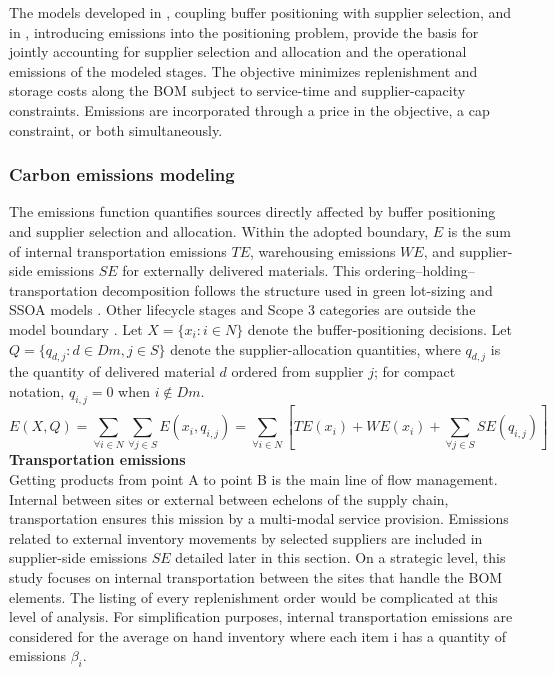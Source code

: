\documentclass[preprint,12pt,authoryear]{elsarticle}
\begin{document}
The models developed in \cite{ACHERGUI4}, coupling buffer positioning with supplier selection, and in \cite{achergui3}, introducing emissions into the positioning problem, provide the basis for jointly accounting for supplier selection and allocation and the operational emissions of the modeled stages. The objective minimizes replenishment and storage costs along the BOM subject to service-time and supplier-capacity constraints. Emissions are incorporated through a price in the objective, a cap constraint, or both simultaneously.
\subsubsection{Carbon emissions modeling}\label{ss:co2}
The emissions function quantifies sources directly affected by buffer positioning and supplier selection and allocation. Within the adopted boundary, $E$ is the sum of internal transportation emissions $TE$, warehousing emissions $WE$, and supplier-side emissions $SE$ for externally delivered materials. This ordering--holding--transportation decomposition follows the structure used in green lot-sizing and SSOA models \citep{lamba2019tfsc,toptal2014}. Other lifecycle stages and Scope 3 categories are outside the model boundary \citep{Matthews2008,huang2009categorization,epa_2022,dekker2012}. Let $X=\{x_i:i\in N\}$ denote the buffer-positioning decisions. Let $Q=\{q_{d,j}:d\in Dm,j\in S\}$ denote the supplier-allocation quantities, where $q_{d,j}$ is the quantity of delivered material $d$ ordered from supplier $j$; for compact notation, $q_{i,j}=0$ when $i\notin Dm$.
\begin{equation}
    E(X,Q) = \sum_{\forall i\in N}\sum_{\forall j\in S} E(x_{i},q_{i,j}) = \sum_{\forall i\in N} [TE(x_{i}) + WE(x_{i}) + \sum_{\forall j\in S} SE(q_{i,j})]
\end{equation}
\textbf{Transportation emissions}\\
Getting products from point A to point B is the main line of flow management. Internal between sites or external between echelons of the supply chain, transportation ensures this mission by a multi-modal service provision.
Emissions related to external inventory movements by selected suppliers are included in supplier-side emissions $SE$ detailed later in this section. On a strategic level, this study focuses on internal transportation between the sites that handle the BOM elements. The listing of every replenishment order would be complicated at this level of analysis. For simplification purposes, internal transportation emissions are considered for the average on hand inventory where each item i has a quantity of emissions $\beta_{i}$.
\end{document}
